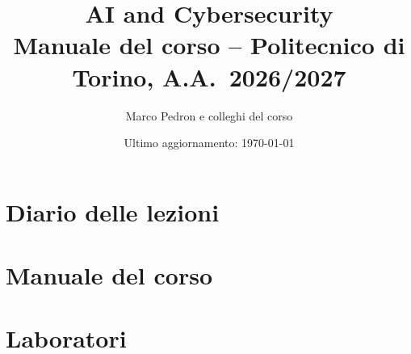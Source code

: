 \documentclass[11pt,a4paper]{report}
\title{AI and Cybersecurity\\[4pt]
  \large Manuale del corso -- Politecnico di Torino, A.A.~2026/2027}
\author{Marco Pedron e colleghi del corso}
\date{Ultimo aggiornamento: \today}
\begin{document}
\maketitle
\tableofcontents


\part{Diario delle lezioni}















\part{Manuale del corso}












\part{Laboratori}





\end{document}
